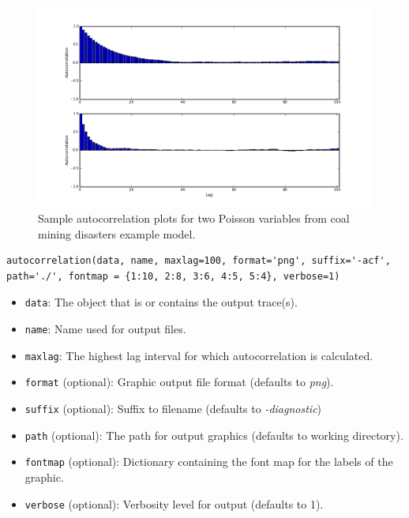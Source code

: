 \begin{figure}[h]
        \begin{center}
        \includegraphics[scale=0.4]{autocorr.png}
    \end{center}
    \caption{Sample autocorrelation plots for two Poisson variables from
coal mining disasters example model.}
    \label{fig:autocorr}
\end{figure}

\begin{verbatim}
autocorrelation(data, name, maxlag=100, format='png', suffix='-acf',
path='./', fontmap = {1:10, 2:8, 3:6, 4:5, 5:4}, verbose=1)
\end{verbatim}
\begin{itemize}
	\item \verb=data=: The object that is or contains the output
trace(s).

	\item \verb=name=: Name used for output files.

	\item \verb=maxlag=: The highest lag interval for which
autocorrelation is calculated.

	\item \verb=format= (optional): Graphic output file format
(defaults to \emph{png}).

	\item \verb=suffix= (optional): Suffix to filename (defaults to
\emph{-diagnostic})

	\item \verb=path= (optional): The path for output graphics
(defaults to working directory).

	\item \verb=fontmap= (optional): Dictionary containing the font map
for the labels of the graphic.

	\item \verb=verbose= (optional): Verbosity level for output
(defaults to 1).
\end{itemize}


